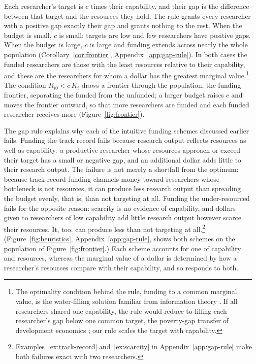 \documentclass[article, 11pt, reqno]{amsart}
\theoremstyle{named}
\begin{document}
Each researcher's target is $c$ times their capability, and their gap is the difference between that target and the resources they hold. The rule grants every researcher with a positive gap exactly their gap and grants nothing to the rest. When the budget is small, $c$ is small: targets are low and few researchers have positive gaps. When the budget is large, $c$ is large and funding extends across nearly the whole population (Corollary~\ref{cor:frontier}, Appendix~\ref{app:gap-rule}). In both cases the funded researchers are those with the least resources relative to their capability, and these are the researchers for whom a dollar has the greatest marginal value.\footnote{The optimality condition behind the rule, funding to a common marginal value, is the water-filling solution familiar from information theory \citep{CoverThomas2006}. If all researchers shared one capability, the rule would reduce to filling each researcher's gap below one common target, the poverty-gap transfer of development economics \citep{FGT1984}; our rule scales the target with capability.} The condition $R_{i0} < c\,K_i$ draws a frontier through the population, the funding frontier, separating the funded from the unfunded; a larger budget raises $c$ and moves the frontier outward, so that more researchers are funded and each funded researcher receives more (Figure~\ref{fig:frontier}).



The gap rule explains why each of the intuitive funding schemes discussed earlier fails. Funding the track record fails because research output reflects resources as well as capability: a productive researcher whose resources approach or exceed their target has a small or negative gap, and an additional dollar adds little to their research output. The failure is not merely a shortfall from the optimum: because track-record funding channels money toward researchers whose bottleneck is not resources, it can produce less research output than spreading the budget evenly, that is, than not targeting at all. Funding the under-resourced fails for the opposite reason: scarcity is no evidence of capability, and dollars given to researchers of low capability add little research output however scarce their resources. It, too, can produce less than not targeting at all.\footnote{Examples~\ref{ex:track-record} and~\ref{ex:scarcity} in Appendix~\ref{app:gap-rule} make both failures exact with two researchers.} (Figure~\ref{fig:heuristics}, Appendix~\ref{app:gap-rule}, shows both schemes on the population of Figure~\ref{fig:frontier}.) Each scheme accounts for one of capability and resources, whereas the marginal value of a dollar is determined by how a researcher's resources compare with their capability, and so responds to both.
\end{document}
